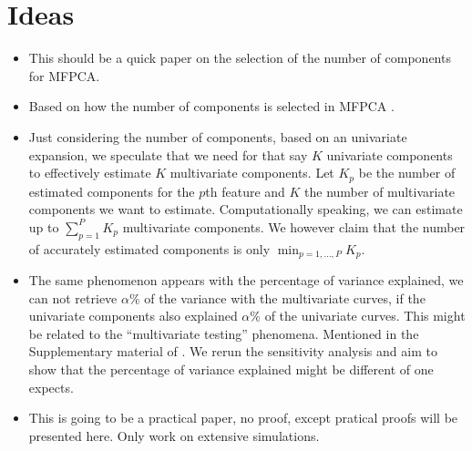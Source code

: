 \section{Ideas} %
\label{sec:ideas}

\begin{itemize}
    \item This should be a quick paper on the selection of the number of components for MFPCA.
    \item Based on how the number of components is selected in MFPCA \cite{happMultivariateFunctionalPrincipal2018a}.
    \item Just considering the number of components, based on an univariate expansion, we speculate that we need for that say $K$ univariate components to effectively estimate $K$ multivariate components.
    Let $K_p$ be the number of estimated components for the $p$th feature and $K$ the number of multivariate components we want to estimate. Computationally speaking, we can estimate up to $\sum_{p = 1}^P K_p$ multivariate components. We however claim that the number of accurately estimated components is only $\min_{p = 1, \dots, P} K_p$.
    \item The same phenomenon appears with the percentage of variance explained, we can not retrieve $\alpha\%$ of the variance with the multivariate curves, if the univariate components also explained $\alpha\%$ of the univariate curves. This might be related to the ``multivariate testing'' phenomena. Mentioned in the Supplementary material of \cite{happMultivariateFunctionalPrincipal2018a}. We rerun the sensitivity analysis and aim to show that the percentage of variance explained might be different of one expects.
    \item This is going to be a practical paper, no proof, except pratical proofs will be presented here. Only work on extensive simulations.
\end{itemize}

